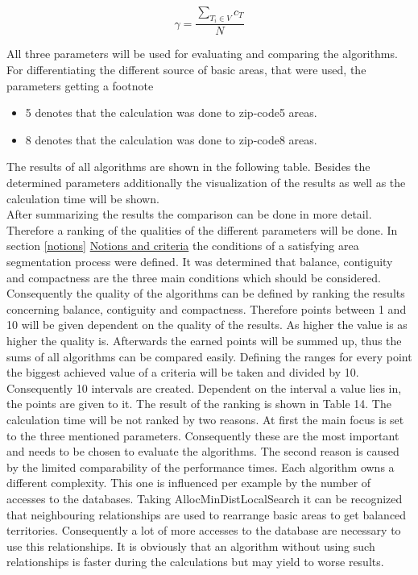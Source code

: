 \[ \mathit{\gamma  = \frac{\sum\nolimits  _{T_{i} \in V} c_{T}}{N}}\]

All three parameters will be used for evaluating and comparing the algorithms. For 
differentiating the different source of basic areas, that were used, the parameters getting a footnote
 \begin{itemize}
 	\item 5 denotes that the calculation was done to zip-code5 areas.
 	\item 8  denotes that the calculation was done to zip-code8 areas.
 \end{itemize}
 
 The results of all algorithms are shown in the following table. Besides the determined parameters additionally the visualization of the results as well as the calculation time will be shown. \newline
 \\ After summarizing the results the comparison can be done in more detail. Therefore a ranking of the qualities of the different parameters will be done. In section \ref{notions} \hyperref[notions]{Notions and criteria} the conditions of a satisfying area segmentation process were defined. It was determined that balance, contiguity and compactness are the three main conditions which should be considered. Consequently the quality of the algorithms can be defined by ranking the results concerning balance, contiguity and compactness. Therefore points between 1 and 10 will be given dependent on the quality of the results. As higher the value is as higher the quality is. Afterwards the earned points will be summed up, thus the sums of all algorithms can be compared easily. Defining the ranges for every point the biggest achieved value of a criteria will be taken and divided by 10. Consequently 10 intervals are created. Dependent on the interval a value lies in, the points are given to it. The result of the ranking is shown in Table 14. The calculation time will be not ranked by two reasons. At first the main focus is set to the three mentioned parameters. Consequently these are the most important and needs to be chosen to evaluate the algorithms. The second reason is caused by the limited comparability of the performance times. Each algorithm owns a different complexity. This one is influenced per example by the number of accesses to the databases. Taking AllocMinDistLocalSearch it can be recognized that neighbouring relationships are used to rearrange basic areas to get balanced territories. Consequently a lot of more accesses to the database are necessary to use this relationships. It is obviously that an algorithm without using such relationships is faster during the calculations but may yield to worse results. 
 


